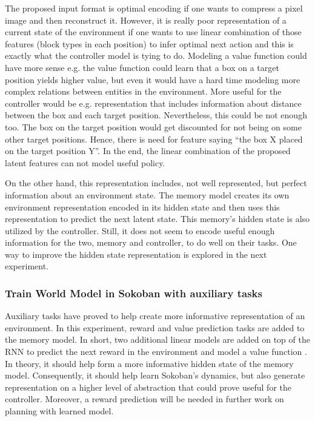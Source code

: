 The proposed input format is optimal encoding if one wants to compress a pixel image and then reconstruct it. However, it is really poor representation of a current state of the environment if one wants to use linear combination of those features (block types in each position) to infer optimal next action and this is exactly what the controller model is tying to do. Modeling a value function could have more sense e.g. the value function could learn that a box on a target position yields higher value, but even it would have a hard time modeling more complex relations between entities in the environment. More useful for the controller would be e.g. representation that includes information about distance between the box and each target position. Nevertheless, this could be not enough too. The box on the target position would get discounted for not being on some other target positions. Hence, there is need for feature saying “the box X placed on the target position Y”. In the end, the linear combination of the proposed latent features can not model useful policy.

On the other hand, this representation includes, not well represented, but perfect information about an environment state. The memory model creates its own environment representation encoded in its hidden state and then uses this representation to predict the next latent state. This memory's hidden state is also utilized by the controller. Still, it does not seem to encode useful enough information for the two, memory and controller, to do well on their tasks. One way to improve the hidden state representation is explored in the next experiment.

\subsubsection{Train World Model in Sokoban with auxiliary tasks}

Auxiliary tasks\cite{Algo.AuxiliaryTasks} have proved to help create more informative representation of an environment. In this experiment, reward and value prediction tasks are added to the memory model. In short, two additional linear models are added on top of the RNN to predict the next reward in the environment and model a value function . In theory, it should help form a more informative hidden state of the memory model. Consequently, it should help learn Sokoban’s dynamics, but also generate representation on a higher level of abstraction that could prove useful for the controller. Moreover, a reward prediction will be needed in further work on planning with learned model.

